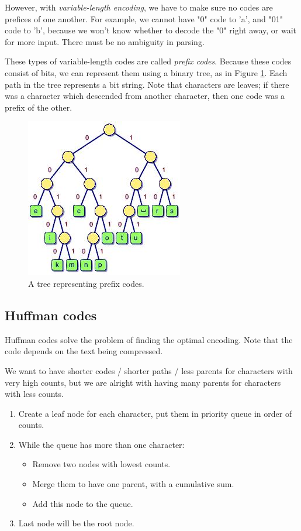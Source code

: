 \documentclass{article}
\begin{document}
However, with \textit{variable-length encoding}, we have to make sure no codes are prefices of one another.  For example, we cannot have "0" code to 'a', and "01" code to 'b', because we won't know whether to decode the "0" right away, or wait for more input.  There must be no ambiguity in parsing.  

These types of variable-length codes are called \textit{prefix codes}.  Because these codes consist of bits, we can represent them using a binary tree, as in Figure \ref{prefix}.  Each path in the tree represents a bit string.  Note that characters are leaves; if there was a character which descended from another character, then one code was a prefix of the other.

\begin{figure}
\centering
\includegraphics[scale=0.8]{img/prefix-code.jpg}
\caption{A tree representing prefix codes.  \label{prefix}}
\end{figure}

\subsection{Huffman codes}
Huffman codes solve the problem of finding the optimal encoding.  Note that the code depends on the text being compressed.

We want to have shorter codes / shorter paths / less parents for characters with very high counts, but we are alright with having many parents for characters with less counts.

\begin{enumerate}
\item Create a leaf node for each character, put them in priority queue in order of counts.
\item While the queue has more than one character:
\begin{itemize}
\item Remove two nodes with lowest counts.
\item Merge them to have one parent, with a cumulative sum.
\item Add this node to the queue.
\end{itemize}
\item Last node will be the root node.
\end{enumerate}
\end{document}
